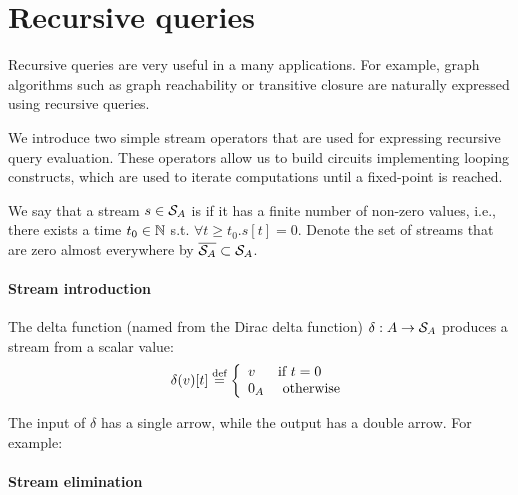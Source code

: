 \section{Recursive queries}\label{sec:recursion}

Recursive queries are very useful in a many applications.
For example, graph algorithms such as graph reachability
or transitive closure are naturally expressed using recursive queries.

We introduce two simple \dbsp stream operators that are used for
expressing recursive query evaluation.  These operators allow us
to build circuits implementing looping constructs, which
are used to iterate computations until a fixed-point is reached.

\begin{definition}\label{def:zae}
We say that a stream $s \in \mathcal{S}_{A}$ is  if it has a finite
number of non-zero values, i.e., there exists a time $t_0 \in \mathbb{N}$
s.t. $\forall t \geq t_0 . s[t] = 0$.
\noindent Denote the set of streams that are zero almost everywhere
by $\overline{\mathcal{S}_{A}} \subset \mathcal{S}_{A}$.
\end{definition}

\paragraph{Stream introduction}

The delta function (named from the Dirac delta function) $\delta : A \rightarrow \mathcal{S}_{A}$
produces a stream from a scalar value:
$$\delta(v)[t] \stackrel{\textrm{\scriptsize def}}{=} \left\{
\begin{array}{ll}
  v & \mbox{if } t = 0 \\
  0_A & \mbox{ otherwise}
\end{array}
\right.
$$

The input of $\delta$ has a single arrow, while the output has a
double arrow.  For example:

\begin{center}
\end{center}

\paragraph{Stream elimination}

